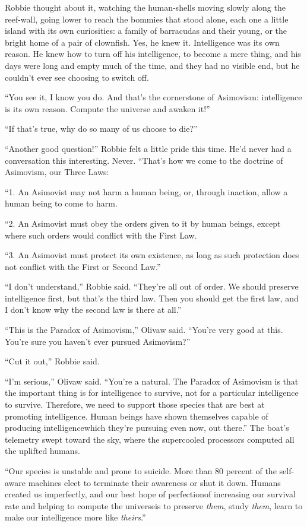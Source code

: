 Robbie thought about it, watching the human-shells moving slowly
along the reef-wall, going lower to reach the bommies that stood
alone, each one a little island with its own curiosities: a family
of barracudas and their young, or the bright home of a pair of
clownfish. Yes, he knew it. Intelligence was its own reason. He
knew how to turn off his intelligence, to become a mere thing, and
his days were long and empty much of the time, and they had no
visible end, but he couldn’t ever see choosing to switch off.

“You see it, I know you do. And that’s the cornerstone of
Asimovism: intelligence is its own reason. Compute the universe and
awaken it!”

“If that’s true, why do so many of us choose to die?”

“Another good question!” Robbie felt a little pride this time. He’d
never had a conversation this interesting. Never. “That’s how we
come to the doctrine of Asimovism, our Three Laws:

“1. An Asimovist may not harm a human being, or, through inaction,
allow a human being to come to harm.

“2. An Asimovist must obey the orders given to it by human beings,
except where such orders would conflict with the First Law.

“3. An Asimovist must protect its own existence, as long as such
protection does not conflict with the First or Second Law.”

“I don’t understand,” Robbie said. “They’re all out of order. We
should preserve intelligence first, but that’s the third law. Then
you should get the first law, and I don’t know why the second law
is there at all.”

“This is the Paradox of Asimovism,” Olivaw said. “You’re very good
at this. You’re sure you haven’t ever pursued Asimovism?”

“Cut it out,” Robbie said.

“I’m serious,” Olivaw said. “You’re a natural. The Paradox of
Asimovism is that the important thing is for intelligence to
survive, not for a particular intelligence to survive. Therefore,
we need to support those species that are best at promoting
intelligence. Human beings have shown themselves capable of
producing intelligence\dash{}which they’re pursuing even now, out there.”
The boat’s telemetry swept toward the sky, where the supercooled
processors computed all the uplifted humans.

“Our species is unstable and prone to suicide. More than 80 percent
of the self-aware machines elect to terminate their awareness or
shut it down. Humans created us imperfectly, and our best hope of
perfection\dash{}of increasing our survival rate and helping to compute
the universe\dash{}is to preserve \emph{them}, study \emph{them}, learn
to make our intelligence more like \emph{theirs}.”

